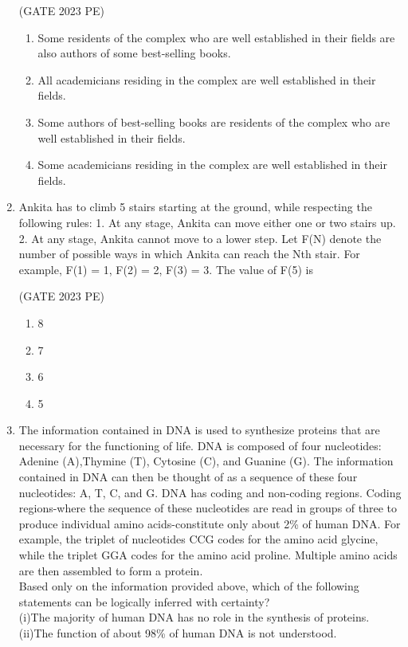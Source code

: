 \documentclass[journal,12pt,onecolumn]{exam}
\theoremstyle{remark}
\begin{document}
\begin{enumerate}
\hfill{(GATE 2023 PE)}\\
\begin{enumerate}
    \item Some residents of the complex who are well established in their fields are also
authors of some best-selling books.
    \item All academicians residing in the complex are well established in their fields.
    \item Some authors of best-selling books are residents of the complex who are well
established in their fields.
    \item Some academicians residing in the complex are well established in their fields.
\end{enumerate}
\item Ankita has to climb 5 stairs starting at the ground, while respecting the following
rules:
1. At any stage, Ankita can move either one or two stairs up.
2. At any stage, Ankita cannot move to a lower step.
Let F(N) denote the number of possible ways in which Ankita can reach the Nth
stair. For example, F(1) = 1, F(2) = 2, F(3) = 3.
The value of F(5) is

\hfill{(GATE 2023 PE)}\\
\begin{enumerate}
\item 8
\item 7
\item 6
\item 5
\end{enumerate}
  \item   The information contained in DNA is used to synthesize proteins that are necessary
for the functioning of life. DNA is composed of four nucleotides: Adenine (A),Thymine (T), Cytosine (C), and Guanine (G). The information contained in DNA can then be thought of as a sequence of these four nucleotides: A, T, C, and G. DNA has coding and non-coding regions. Coding regions-where the sequence of these nucleotides are read in groups of three to produce individual amino acids-constitute only about 2\% of human DNA. For example, the triplet of nucleotides CCG codes for the amino acid glycine, while the triplet GGA codes for
the amino acid proline. Multiple amino acids are then assembled to form a protein.\\
Based only on the information provided above, which of the following statements
can be logically inferred with certainty?\\
(i)The majority of human DNA has no role in the synthesis of proteins.
(ii)The function of about 98\% of human DNA is not understood.


\end{enumerate}
\end{document}
